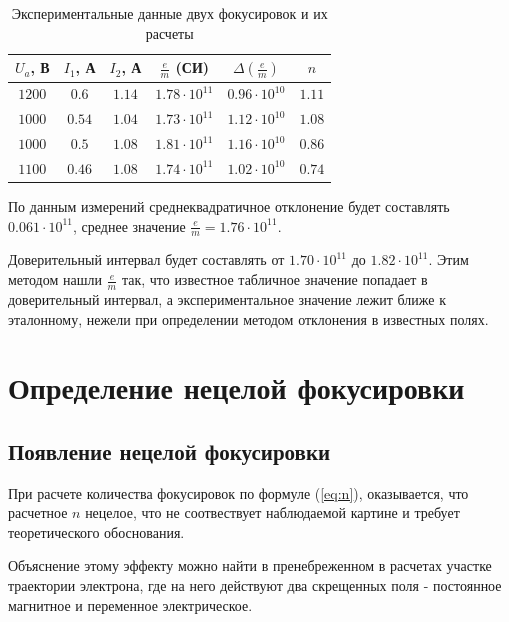 \begin{table}[ht!]
\begin{center}
\begin{tabular}{|c|c|c|c|c|c|}

\hline
$U_a$, В & $I_1$, А & $I_2$, А & $\frac{e}{m}$ (СИ) & $\Delta{(\frac{e}{m})}$ & $n$\\
\hline
$1200$ & $0.6$ & $1.14$ & $1.78\cdot10^{11}$ & $0.96\cdot10^{10}$  & $1.11$ \\ \hline
$1000$ & $0.54$ & $1.04$ & $1.73\cdot10^{11}$ & $1.12\cdot10^{10}$ & $1.08$ \\ \hline
$1000$ & $0.5$ & $1.08$ & $1.81\cdot10^{11}$ & $1.16\cdot10^{10}$  & $0.86$ \\ \hline
$1100$ & $0.46$ & $1.08$ & $1.74\cdot10^{11}$ & $1.02\cdot10^{10}$ & $0.74$ \\ \hline

\end{tabular}
\end{center}
\caption{\label{tab:B_z}Экспериментальные данные двух фокусировок и их расчеты}
\end{table} 


По данным измерений среднеквадратичное отклонение будет составлять $0.061\cdot10^{11}$, среднее значение $\frac{e}{m}=1.76\cdot10^{11}$.

Доверительный интервал будет составлять от $1.70\cdot10^{11}$ до $1.82\cdot10^{11}$. Этим методом нашли $\frac{e}{m}$ так, что известное табличное значение попадает в доверительный интервал, а экспериментальное значение лежит ближе к эталонному, нежели при определении методом отклонения в известных полях.

\newpage
\section{Определение нецелой фокусировки}

\subsection{Появление нецелой фокусировки}

При расчете количества фокусировок по формуле (\ref{eq:n}), оказывается, что расчетное $n$ нецелое, что не соотвествует наблюдаемой картине и требует теоретического обоснования.

Объяснение этому эффекту можно найти в пренебреженном в расчетах участке траектории электрона, где на него действуют два скрещенных поля - постоянное магнитное и переменное электрическое.

